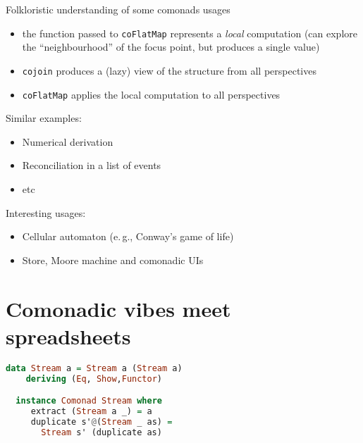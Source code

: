 \documentclass[10pt]{beamer}
\providecommand{\eg}{e.\,g.}
\begin{document}
\begin{frame}[fragile]
  \begin{alertblock}{Folkloristic understanding of some comonads usages}
    \begin{itemize}
  \item the function passed to \verb|coFlatMap| represents a \emph{local} computation (can explore the ``neighbourhood'' of the focus point, but produces a single value) 
  \item \verb|cojoin| produces a (lazy) view of the structure from all perspectives 
  \item \verb|coFlatMap| applies the local computation to all perspectives 
    \end{itemize}
  \end{alertblock}
\end{frame}
\begin{frame}[fragile]
  Similar examples:
  \begin{itemize}
    \item Numerical derivation
    \item Reconciliation in a list of events
    \item etc
  \end{itemize}
\end{frame}

\begin{frame}[fragile]
  Interesting usages:
  \begin{itemize}
    \item Cellular automaton (\eg, Conway’s game of life)
    \item Store, Moore machine and comonadic UIs
  \end{itemize}
\end{frame}

\section{Comonadic vibes meet spreadsheets}

\begin{frame}[fragile]
\begin{lstlisting}[language=haskell, basicstyle=\ttfamily]
  data Stream a = Stream a (Stream a)
    deriving (Eq, Show,Functor)

  instance Comonad Stream where
     extract (Stream a _) = a
     duplicate s'@(Stream _ as) = 
       Stream s' (duplicate as)
  
\end{lstlisting}
\end{frame}
\end{document}
